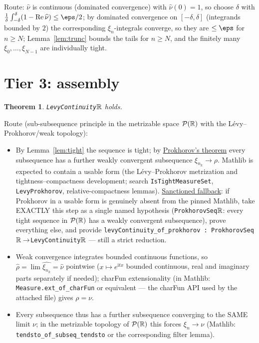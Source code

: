 \documentclass[11pt]{article}
\theoremstyle{plain}
\newtheorem{theorem}{Theorem}
\theoremstyle{remark}
\begin{document}
\noindent Route: $\widehat\nu$ is continuous (dominated convergence) with
$\widehat\nu(0)=1$, so choose $\delta$ with
$\frac1\delta\int_{-\delta}^\delta(1-\mathrm{Re}\,\widehat\nu)\le\eps/2$;
by dominated convergence on $[-\delta,\delta]$ (integrands bounded by $2$)
the corresponding $\xi_n$-integrals converge, so they are $\le\eps$ for
$n\ge N$; Lemma~\ref{lem:trunc} bounds the tails for $n\ge N$, and the finitely
many $\xi_0,\dots,\xi_{N-1}$ are individually tight.

\section*{Tier 3: assembly}

\begin{theorem}\label{thm:levy}
\texttt{LevyContinuity}$\mathbb{R}$ holds.
\end{theorem}

\noindent Route (sub-subsequence principle in the metrizable space
$\mathcal P(\mathbb{R})$ with the L\'evy--Prokhorov/weak topology):
\begin{itemize}
\item[(i)] By Lemma~\ref{lem:tight} the sequence is tight; by
\underline{Prokhorov's theorem} every subsequence has a further weakly convergent
subsequence $\xi_{n_k}\to\rho$. Mathlib is expected to contain a usable form
(the L\'evy--Prokhorov metrization and tightness--compactness development;
search \texttt{IsTightMeasureSet}, \texttt{LevyProkhorov},
relative-compactness lemmas). \underline{Sanctioned fallback}: if Prokhorov in a
usable form is genuinely absent from the pinned Mathlib, take EXACTLY this
step as a single named hypothesis (\texttt{ProkhorovSeq}$\mathbb{R}$: every tight
sequence in $\mathcal P(\mathbb{R})$ has a weakly convergent subsequence), prove
everything else, and provide \texttt{levyContinuity\_of\_prokhorov :
ProkhorovSeq}$\mathbb{R}\to$\texttt{LevyContinuity}$\mathbb{R}$ --- still a strict reduction.
\item[(ii)] Weak convergence integrates bounded continuous functions, so
$\widehat\rho=\lim\widehat{\xi_{n_k}}=\widehat\nu$ pointwise ($x\mapsto
e^{\mathrm itx}$ bounded continuous, real and imaginary parts separately if
needed); charFun extensionality (in Mathlib:
\texttt{Measure.ext\_of\_charFun} or equivalent --- the charFun API used by
the attached file) gives $\rho=\nu$.
\item[(iii)] Every subsequence thus has a further subsequence converging to
the SAME limit $\nu$; in the metrizable topology of $\mathcal P(\mathbb{R})$ this
forces $\xi_n\to\nu$ (Mathlib: \texttt{tendsto\_of\_subseq\_tendsto} or the
corresponding filter lemma).
\end{itemize}
\end{document}
